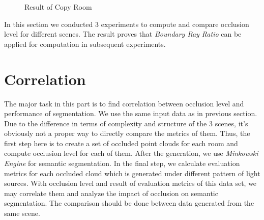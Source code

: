 \documentclass[11pt, a4paper,oneside,chapterprefix=false]{scrbook}
\begin{document}
\begin{figure}[H]
    \centering
    \caption{Result of Copy Room}
    \label{fig:result of copy room}
\end{figure}

In this section we conducted 3 experiments to compute and compare occlusion level for different scenes. The result proves that \emph{Boundary Ray Ratio} can be applied for computation in subsequent experiments.

\section{Correlation}

The major task in this part is to find correlation between occlusion level and performance of segmentation. We use the same input data as in previous section. Due to the difference in terms of complexity and structure of the 3 scenes, it's obviously not a proper way to directly compare the metrics of them. Thus, the first step here is to create a set of occluded point clouds for each room and compute occlusion level for each of them. After the generation, we use \emph{Minkowski Engine} for semantic segmentation. In the final step, we calculate evaluation metrics for each occluded cloud which is generated under different pattern of light sources. With occlusion level and result of evaluation metrics of this data set, we may correlate them and analyze the impact of occlusion on semantic segmentation. The comparison should be done between data generated from the same scene.
\end{document}
